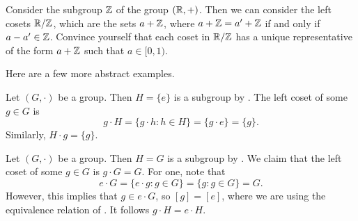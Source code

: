\documentclass[../main.tex]{subfiles}
\begin{document}
\begin{example} \label{ex:r-mod-z}
    Consider the subgroup $\mathbb Z$ of the group $(\mathbb R,+)$. Then we can consider the left cosets $\mathbb R/\mathbb Z$, which are the sets $a+\mathbb Z$, where $a+\mathbb Z=a'+\mathbb Z$ if and only if $a-a'\in\mathbb Z$. Convince yourself that each coset in $\mathbb R/\mathbb Z$ has a unique representative of the form $a+\mathbb Z$ such that $a\in[0,1)$.
\end{example}
Here are a few more abstract examples.
\begin{example} \label{ex:trivial-cosets}
    Let $(G,\cdot)$ be a group. Then $H=\{e\}$ is a subgroup by . The left coset of some $g\in G$ is
    \[g\cdot H=\{g\cdot h:h\in H\}=\{g\cdot e\}=\{g\}.\]
    Similarly, $H\cdot g=\{g\}$.
\end{example}
\begin{example}
    Let $(G,\cdot)$ be a group. Then $H=G$ is a subgroup by . We claim that the left coset of some $g\in G$ is $g\cdot G=G$. For one, note that
    \[e\cdot G=\{e\cdot g:g\in G\}=\{g:g\in G\}=G.\]
    However, this implies that $g\in e\cdot G$, so $[g]=[e]$, where we are using the equivalence relation of . It follows $g\cdot H=e\cdot H$.
\end{example}
\end{document}
